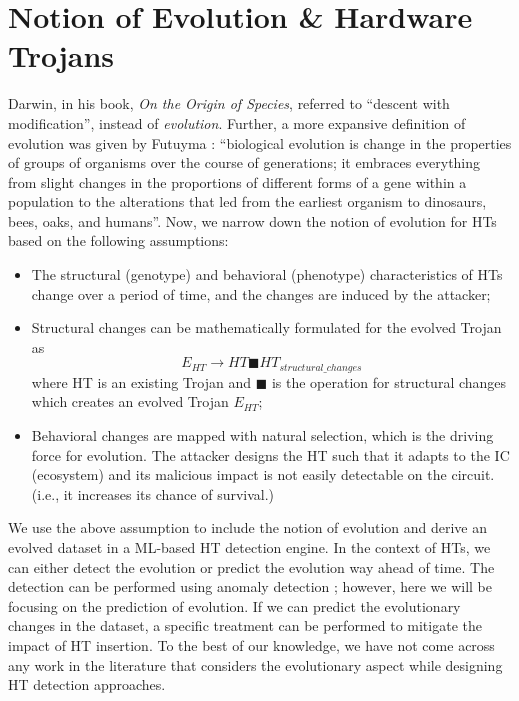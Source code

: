\documentclass[9pt,conference]{IEEEtran}
\begin{document}
\section{Notion of Evolution \& Hardware Trojans} 
\label{sec:Evolution}
Darwin, in his book, \textit{On the Origin of Species}, referred to ``descent with modification'', instead of \textit{evolution}. Further, a more expansive definition of evolution was given by Futuyma \cite{laland2014does}: ``biological evolution is change in the properties of groups of organisms over the course of generations; it embraces everything from slight changes in the proportions of different forms of a gene within a population to the alterations that led from the earliest organism to dinosaurs, bees, oaks, and humans''. Now, we narrow down the notion of evolution for HTs based on the following assumptions:

\begin{itemize}
    \item The structural (genotype) and behavioral (phenotype) characteristics of HTs change over a period of time, and the changes are induced by the attacker;
    \item Structural changes can be mathematically formulated for the evolved Trojan as \[ E_{HT} \rightarrow HT \blacksquare HT_{structural\_changes} \] 
    where HT is an existing Trojan and $\blacksquare$ is the operation for structural changes which creates an evolved Trojan $E_{HT}$;
    \item Behavioral changes are mapped with natural selection, which is the driving force for evolution. The attacker designs the HT such that it adapts to the IC (ecosystem) and its malicious impact is not easily detectable on the circuit. (i.e., it increases its chance of survival.)
\end{itemize}

We use the above assumption to include the notion of evolution and derive an evolved dataset in a ML-based HT detection engine. In the context of HTs, we can either detect the evolution or predict the evolution way ahead of time. The detection can be performed using anomaly detection \cite{liu2022anomaly}; however, here we will be focusing on the prediction of evolution. If we can predict the evolutionary changes in the dataset, a specific treatment can be performed to mitigate the impact of HT insertion. To the best of our knowledge, we have not come across any work in the literature that considers the evolutionary aspect while designing HT detection approaches.
\end{document}
